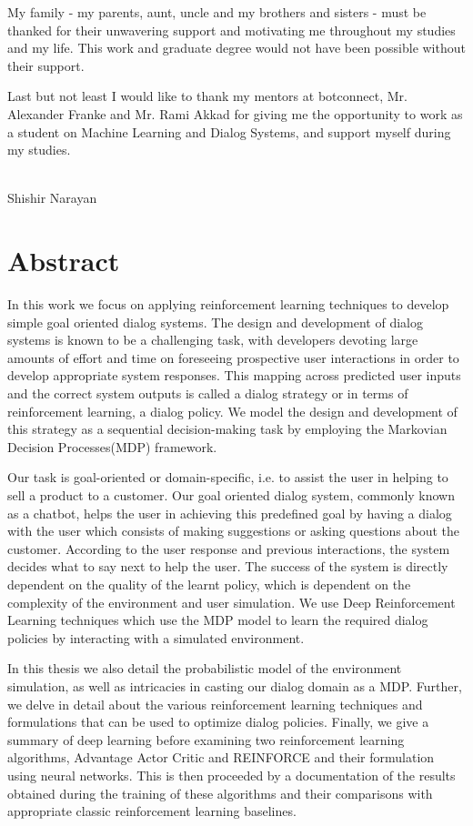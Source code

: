 \documentclass[12pt]{extarticle}
\numberwithin{equation}{section}
\begin{document}
My family - my parents, aunt, uncle and my brothers and sisters - must be thanked for their unwavering support and motivating me throughout my studies and my life. This work and graduate degree would not have been possible without their support.

Last but not least I would like to thank my mentors at botconnect, Mr. Alexander Franke and Mr. Rami Akkad for giving me the opportunity to work as a student on Machine Learning and Dialog Systems, and support myself during my studies.
\\\\
\begin{flushright}
	Shishir Narayan\\
	\date{\today}
\end{flushright}
\clearpage
	
	\section*{Abstract}
	In this work we focus on applying reinforcement learning techniques to develop simple goal oriented dialog systems. The design and development of dialog systems is known to be a challenging task, with developers devoting  large amounts of effort and time on foreseeing prospective user interactions in order to develop appropriate system responses. This mapping across predicted user inputs and the correct system outputs is called a dialog strategy or in terms of reinforcement learning, a dialog policy. We model the design and development of this strategy as a sequential decision-making task by employing the Markovian Decision Processes(MDP) framework. 
	
	Our task is goal-oriented or domain-specific, i.e. to assist the user in helping to sell a product to a customer. Our goal oriented dialog system, commonly known as a chatbot, helps the user in achieving this predefined goal by having a dialog with the user which consists of making suggestions or asking questions about the customer. According to the user response and previous interactions, the system decides what to say next to help the user. The success of the system is directly dependent on the quality of the learnt policy, which is dependent on the complexity of the environment and user simulation. We use Deep Reinforcement Learning techniques which use the MDP model to learn the required dialog policies by interacting with a simulated environment. 
	
	In this thesis we also detail the probabilistic model of the environment simulation, as well as intricacies in casting our dialog domain as a MDP. Further, we delve in detail about the various reinforcement learning techniques and formulations that can be used to optimize dialog policies. Finally, we give a summary of deep learning before examining two reinforcement learning algorithms, Advantage Actor Critic and REINFORCE and their formulation using neural networks. This is then proceeded by a documentation of the results obtained during the training of these algorithms and their comparisons with appropriate classic reinforcement learning baselines. 
	\clearpage
	\tableofcontents
	
\end{document}
